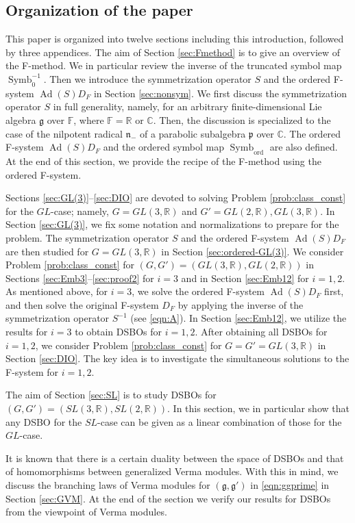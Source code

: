\documentclass[a4paper,11pt,reqno]{amsart}
\newcommand{\frakg}{\mathfrak{g}}
\newcommand{\frakn}{\mathfrak{n}}
\newcommand{\frakp}{\mathfrak{p}}
\newcommand{\0}{{\bf 0}}
\newcommand{\R}{\mathbb{R}}
\newcommand{\C}{\mathbb{C}}
\newcommand{\F}{\mathbb{F}}
\newcommand{\1}{{\bf 1}}
\DeclareMathOperator{\Ad}{Ad}
\newcommand{\ord}{{\mathrm{ord}}}
\DeclareMathOperator{\Symb}{Symb}
\theoremstyle{plain}
\theoremstyle{definition}
\numberwithin{equation}{section}
\theoremstyle{definition}
\begin{document}
\subsection{Organization of the paper}
This paper is organized into twelve sections including this introduction, followed by three appendices.
The aim of Section \ref{sec:Fmethod} is to give an overview of the F-method. 
We in particular review the inverse of the truncated symbol map
$\Symb_0^{-1}$. Then we introduce the symmetrization operator $S$ and the ordered F-system $\Ad(S)D_F$ in Section \ref{sec:nonsym}. We first discuss the symmetrization operator $S$ in full generality, namely, for an arbitrary finite-dimensional Lie algebra $\frakg$ over $\F$, where $\F=\R$ or $\C$. 
Then, the discussion is specialized to 
the case of the nilpotent radical $\frakn_-$ of a parabolic subalgebra $\frakp$
over $\C$. 
The ordered F-system
$\Ad(S)D_F$ and the ordered symbol map $\Symb_{\ord}$ are also defined.
At the end of this section, we provide the recipe of the F-method using the ordered F-system.

Sections \ref{sec:GL(3)}--\ref{sec:DIO} are devoted to solving 
Problem \ref{prob:class_const} for the $GL$-case; namely, 
$G=GL(3,\R)$ and 
$G'=GL(2,\R),GL(3,\R)$. 
In Section \ref{sec:GL(3)},
we fix some notation and normalizations to prepare for the problem. 
The symmetrization operator $S$ and the ordered F-system $\Ad(S)D_F$ are 
then studied for $G=GL(3,\R)$ in Section \ref{sec:ordered-GL(3)}. 
We consider Problem \ref{prob:class_const}  for 
$(G,G')=(GL(3,\R),GL(2,\R))$
in Sections \ref{sec:Emb3}--\ref{sec:proof2} for $i=3$ and 
in Section \ref{sec:Emb12} for $i=1,2$.
As mentioned above, for $i=3$, we solve the ordered F-system
$\Ad(S)D_F$ first, and then solve the original F-system $D_F$ by applying  
the inverse of the symmetrization operator  $S^{-1}$ (see \eqref{eqn:A}).
In Section \ref{sec:Emb12}, we utilize the results for $i=3$ to obtain DSBOs for $i=1,2$. 
After obtaining all DSBOs for $i=1,2$, we consider Problem \ref{prob:class_const} for $G=G'=GL(3,\R)$ in Section \ref{sec:DIO}. The key idea is to investigate the simultaneous solutions to the F-system for $i=1,2$.

The aim of Section \ref{sec:SL} is to study DSBOs for $(G,G')=(SL(3,\R), SL(2,\R))$.
In this section, we in particular show that any DSBO for the $SL$-case 
can be given as a linear combination of those for the $GL$-case.

It is known that there is a certain duality between the space of DSBOs and 
that of homomorphisms between generalized Verma modules. 
With this in mind, we discuss the branching laws of Verma modules for $(\frakg, \frakg')$ in \eqref{eqn:ggprime} in Section \ref{sec:GVM}. 
At the end of the section 
we verify our results for DSBOs from the viewpoint of Verma modules.
\end{document}
